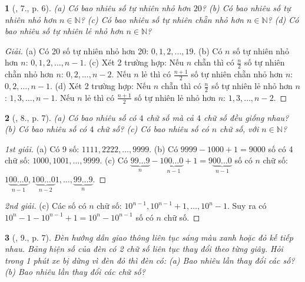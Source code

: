 \documentclass{article}
\newtheorem{baitoan}{}
\begin{document}
\begin{baitoan}[\cite{Tuyen_Toan_6}, 7., p. 6]
	(a) Có bao nhiêu số tự nhiên nhỏ hơn $20$? (b) Có bao nhiêu số tự nhiên nhỏ hơn $n\in\mathbb{N}$? (c) Có bao nhiêu số tự nhiên chẵn nhỏ hơn $n\in\mathbb{N}$? (d) Có bao nhiêu số tự nhiên lẻ nhỏ hơn $n\in\mathbb{N}$?
\end{baitoan}

\begin{proof}[Giải]
	(a) Có 20 số tự nhiên nhỏ hơn 20: $0,1,2,\ldots,19$. (b) Có $n$ số tự nhiên nhỏ hơn $n$: $0,1,2,\ldots,n - 1$. (c) Xét 2 trường hợp: Nếu $n$ chẵn thì có $\frac{n}{2}$ số tự nhiên chẵn nhỏ hơn $n$: $0,2,\ldots,n - 2$. Nếu $n$ lẻ thì có $\frac{n + 1}{2}$ số tự nhiên chẵn nhỏ hơn $n$: $0,2,\ldots,n - 1$. (d) Xét 2 trường hợp: Nếu $n$ chẵn thì có $\frac{n}{2}$ số tự nhiên lẻ nhỏ hơn $n$: $1,3,\ldots,n - 1$. Nếu $n$ lẻ thì có $\frac{n + 1}{2}$ số tự nhiên lẻ nhỏ hơn $n$: $1,3,\ldots,n - 2$.
\end{proof}

\begin{baitoan}[\cite{Tuyen_Toan_6}, 8., p. 7]
	(a) Có bao nhiêu số có $4$ chữ số mà cả $4$ chữ số đều giống nhau? (b) Có bao nhiêu số có $4$ chữ số? (c) Có bao nhiêu số có $n$ chữ số, với $n\in\mathbb{N}$?
\end{baitoan}

\begin{proof}[1st giải]
	(a) Có 9 số: $1111,2222,\ldots,9999$. (b) Có $9999 - 1000 + 1 = 9000$ số có 4 chữ số: $1000,1001,\ldots,9999$. (c) Có $\underbrace{99\ldots9}_n - 1\underbrace{00\ldots0}_{n-1} + 1 = 9\underbrace{00\ldots0}_{n-1}$ số có $n$ chữ số: $1\underbrace{00\ldots0}_{n-1},1\underbrace{00\ldots0}_{n-2}1,\ldots,\underbrace{99\ldots9}_n$.
\end{proof}

\begin{proof}[2nd giải]
	(c) Các số có $n$ chữ số: $10^{n-1},10^{n-1} + 1,\ldots,10^n - 1$. Suy ra có $10^n - 1 - 10^{n-1} + 1 = 10^n - 10^{n-1}$ số có $n$ chữ số.
\end{proof}

\begin{baitoan}[\cite{Tuyen_Toan_6}, 9., p. 7]
	Đèn hướng dẫn giao thông liên tục sáng màu xanh hoặc đỏ kế tiếp nhau. Bảng hiện số của đèn có 2 chữ số liên tục thay đổi theo từng giây. Hỏi trong 1 phút xe bị dừng vì đèn đỏ thì đèn có: (a) Bao nhiêu lần thay đổi các số? (b) Bao nhiêu lần thay đổi các chữ số?
\end{baitoan}
\end{document}
